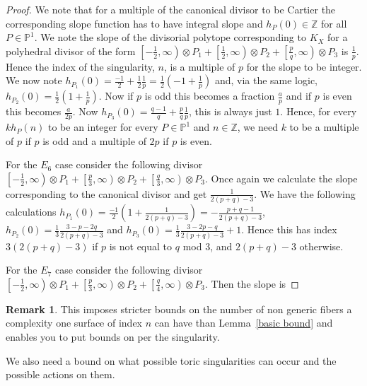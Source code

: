 \documentclass[12pt,a4paper]{book}      %
\theoremstyle{definition}
\newtheorem*{rem}{Remark}
\newcommand{\mb}[1]{\mathbb{#1}}
\begin{document}
\begin{proof}
We note that for a multiple of the canonical divisor to be Cartier the corresponding slope function has to have integral slope and $h_P(0) \in \mathbb{Z}$ for all $P \in \mb{P}^1$. We note the slope of the divisorial polytope corresponding to $K_X$ for a polyhedral divisor of the form $\left[-\frac{1}{2}, \infty \right) \otimes P_1 + \left[ \frac{1}{2}, \infty \right) \otimes P_2 + \left[ \frac{p}{q}, \infty \right) \otimes P_3$ is $\frac{1}{p}$. Hence the index of the singularity, $n$, is a multiple of $p$ for the slope to be integer. We now note $h_{P_1} (0) = \frac{-1}{2} + \frac{1}{2} \frac{1}{p} = \frac{1}{2} (-1 + \frac{1}{p})$ and, via the same logic, $h_{P_2} (0) = \frac{1}{2} (1 + \frac{1}{p})$. Now if $p$ is odd this becomes a fraction $\frac{a}{p}$ and if $p$ is even this becomes $\frac{a}{2p}$. Now $h_{P_3}(0) = \frac{q-1}{q} + \frac{p}{q} \frac{1}{p}$, this is always just $1$. Hence, for every $k h_P(n)$ to be an integer for every $P \in \mb{P}^1$ and $n \in \mb{Z}$, we need $k$ to be a multiple of $p$ if $p$ is odd and a multiple of $2p$ if $p$ is even.

For the $E_6$ case consider the following divisor $\left[-\frac{1}{2}, \infty \right) \otimes P_1 + \left[ \frac{p}{3}, \infty \right) \otimes P_2 + \left[ \frac{q}{3}, \infty \right) \otimes P_3$.  Once again we calculate the slope corresponding to the canonical divisor and get $\frac{1}{2(p+q)-3}$. We have the following calculations $h_{P_1}(0) = \frac{-1}{2}(1 +\frac{1}{2(p+q)-3}) = -\frac{p+q-1}{2(p+q)-3}$, $h_{P_2}(0) =\frac{1}{3} \frac{3-p-2q}{2(p+q) - 3}$ and $h_{P_3}(0) = \frac{1}{3} \frac{3-2p-q}{2(p+q) - 3} + 1$. Hence this has index $3(2(p+q) - 3)$ if $p$ is not equal to $q$ mod 3, and $2(p+q) - 3$ otherwise.



For the $E_7$ case consider the following divisor $\left[-\frac{1}{2}, \infty \right) \otimes P_1 + \left[ \frac{p}{3}, \infty \right) \otimes P_2 + \left[ \frac{q}{4}, \infty \right) \otimes P_3$. Then the slope is  
\end{proof}

\begin{rem}
This imposes stricter bounds on the number of non generic fibers a complexity one surface of index $n$ can have than Lemma~\ref{basic bound} and enables you to put bounds on per the singularity. 
\end{rem}

We also need a bound on what possible toric singularities can occur and the possible actions on them.
\end{document}
